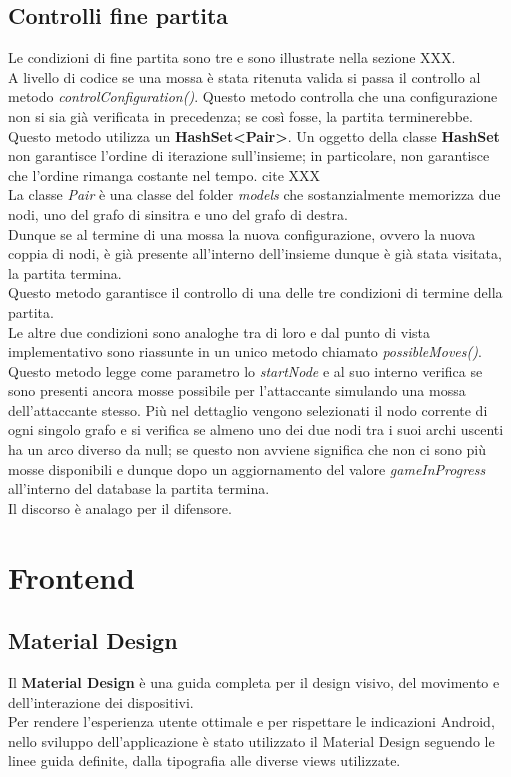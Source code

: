 \documentclass[a4paper,11pt,twoside,openright]{report}
\begin{document}
\subsection{Controlli fine partita}
Le condizioni di fine partita sono tre e sono illustrate nella sezione XXX.\\
A livello di codice se una mossa è stata ritenuta valida si passa il controllo al metodo \textit{controlConfiguration()}. Questo metodo controlla che una configurazione non si sia già verificata in precedenza; se così fosse, la partita terminerebbe.\\
Questo metodo utilizza un \textbf{HashSet<Pair>}. Un oggetto della classe \textbf{HashSet} non garantisce l'ordine di iterazione sull'insieme; in particolare, non garantisce che l'ordine rimanga costante nel tempo. cite XXX\\
La classe \textit{Pair} è una classe del folder \textit{models} che sostanzialmente memorizza due nodi, uno del grafo di sinsitra e uno del grafo di destra.\\
Dunque se al termine di una mossa la nuova configurazione, ovvero la nuova coppia di nodi, è già presente all'interno dell'insieme dunque è già stata visitata, la partita termina.\\
Questo metodo garantisce il controllo di una delle tre condizioni di termine della partita.\\
Le altre due condizioni sono analoghe tra di loro e dal punto di vista implementativo sono riassunte in un unico metodo chiamato \textit{possibleMoves()}. Questo metodo legge come parametro lo \textit{startNode} e al suo interno verifica se sono presenti ancora mosse possibile per l'attaccante simulando una mossa dell'attaccante stesso. Più nel dettaglio vengono selezionati il nodo corrente di ogni singolo grafo e si verifica se almeno uno dei due nodi tra i suoi archi uscenti ha un arco diverso da null; se questo non avviene significa che non ci sono più mosse disponibili e dunque dopo un aggiornamento del valore \textit{gameInProgress} all'interno del database la partita termina.\\
Il discorso è analago per il difensore.

\section{Frontend}
\subsection{Material Design}
Il \textbf{Material Design} \cite{10} è una guida completa per il design visivo, del movimento e dell'interazione dei dispositivi.\\
Per rendere l'esperienza utente ottimale e per rispettare le indicazioni Android, nello sviluppo dell'applicazione è stato utilizzato il Material Design seguendo le linee guida definite, dalla tipografia alle diverse views utilizzate.
\end{document}
